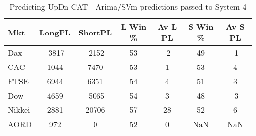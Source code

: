 \begin{table}[ht]
\centering
\caption[Predicting UpDn CAT - Arima/SVM predictions passed to System 4.]{Predicting UpDn CAT - Arima/SVm predictions passed to System 4} 
\label{tab:chp_ts:pUD_CAT_arima_svm_sys}
\begin{tabular}{lcccccc}
  \toprule Mkt & LongPL & ShortPL & L Win \% & Av L PL & S Win \% & Av S PL \\ 
  \midrule Dax & -3817 & -2152 & 53 & -2 & 49 & -1 \\ 
  CAC & 1044 & 7470 & 53 & 1 & 53 & 4 \\ 
  FTSE & 6944 & 6351 & 54 & 4 & 51 & 3 \\ 
  Dow & 4659 & -5065 & 54 & 3 & 48 & -3 \\ 
  Nikkei & 2881 & 20706 & 57 & 28 & 52 & 6 \\ 
  AORD & 972 & 0 & 52 & 0 & NaN & NaN \\ 
   \bottomrule \end{tabular}
\end{table}
